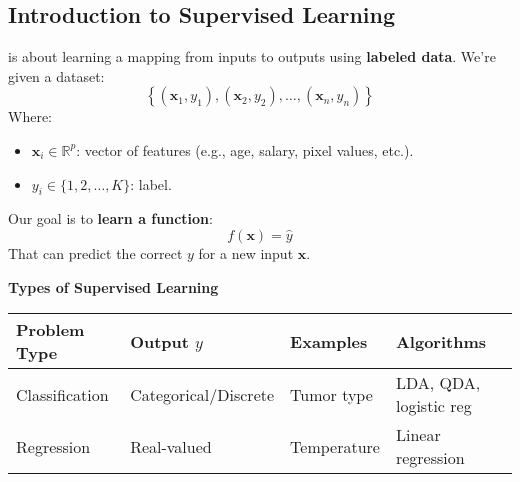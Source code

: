 \subsection{Introduction to Supervised Learning}

 is about learning a mapping from inputs to outputs using \textbf{labeled data}. We're given a dataset:
\begin{equation}
    \left\{\left(\mathbf{x}_1, y_1\right), \left(\mathbf{x}_2, y_2\right), \dots, \left(\mathbf{x}_n, y_n\right)\right\}
\end{equation}
Where:
\begin{itemize}
    \item $\mathbf{x}_i \in \mathbb{R}^p$: vector of features (e.g., age, salary, pixel values, etc.).
    \item $y_i \in \{1, 2, \dots, K\}$: label.
\end{itemize}
Our goal is to \textbf{learn a function}:
\begin{equation}
    f\left(\mathbf{x}\right) = \hat{y}
\end{equation}
That can predict the correct $y$ for a new input $\mathbf{x}$.

\highspace
\begin{flushleft}
    \textcolor{Green3}{ \textbf{Types of Supervised Learning}}
\end{flushleft}
\begin{table}[!htp]
    \centering
    \begin{adjustbox}{width={\textwidth},totalheight={\textheight},keepaspectratio}
        \begin{tabular}{@{} l | l | l | l @{}}
            \toprule
            \textbf{Problem Type}   & \textbf{Output} $y$   & \textbf{Examples} & \textbf{Algorithms}       \\
            \midrule
            Classification          & Categorical/Discrete  & Tumor type        & LDA, QDA, logistic reg    \\ [.3em]
            Regression              & Real-valued           & Temperature       & Linear regression         \\
            \bottomrule
        \end{tabular}
    \end{adjustbox}
\end{table}

